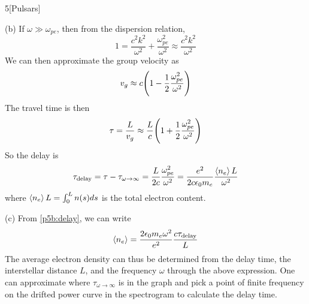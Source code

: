 \documentclass[12pt]{article}
\begin{document}
\begin{problem}{5}[Pulsars]
\begin{solution}
(b) If $\omega\gg\omega_{pe}$, then from the dispersion relation,
\begin{equation}
    1=\frac{c^2k^2}{\omega^2}+\frac{\omega_{pe}^2}{\omega^2}
    \approx\frac{c^2k^2}{\omega^2}
\end{equation}
We can then approximate the group velocity as
\begin{equation}
    v_g\approx c\qty(1-\frac12\frac{\omega_{pe}^2}{\omega^2}) 
\end{equation}
The travel time is then
\begin{equation}
    \tau=\frac{L}{v_g}\approx\frac{L}{c}\qty(1+\frac12\frac{\omega_{pe}^2}{\omega^2})
\end{equation}
So the delay is 
\begin{equation}\label{p5b:delay}
    \tau_{\text{delay}}=\tau-\tau_{\omega\to\infty}
    =\frac{L}{2c}\frac{\omega_{pe}^2}{\omega^2}
    =\frac{e^2}{2c\epsilon_0m_e}\frac{\expval{n_e}L}{\omega^2}
\end{equation}
where $\expval{n_e}L=\int_0^Ln(s)ds$ is the total electron content.

(c) From \eqref{p5b:delay}, we can write
\begin{equation}
    \expval{n_e}=\frac{2\epsilon_0m_e\omega^2}{e^2}\frac{c\tau_{\text{delay}}}{L} 
\end{equation}
The average electron density can thus be determined from the delay time, the
interstellar distance $L$, and the frequency $\omega$ through the above
expression. One can approximate where $\tau_{\omega\to\infty}$ is in the graph
and pick a point of finite frequency on the drifted power curve in the 
spectrogram to calculate the delay time.
\end{solution}
\end{problem}
\end{document}
